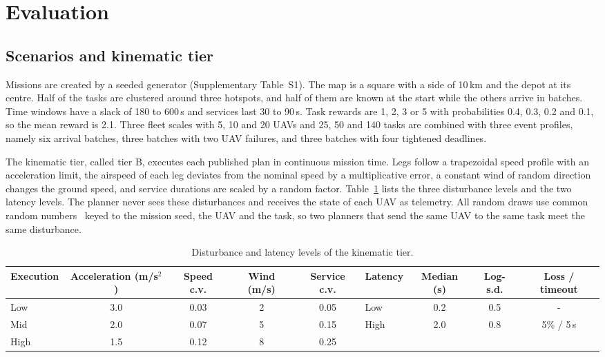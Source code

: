 \documentclass[a4paper,fleqn]{cas-dc}
\begin{document}
\section{Evaluation}\label{sec:setup}
\subsection{Scenarios and kinematic tier}
Missions are created by a seeded generator (Supplementary Table~S1). The map is a square with a side
of 10\,km and the depot at its centre. Half of the tasks are clustered around three hotspots, and half of them are
known at the start while the others arrive in batches. Time windows have a slack of 180 to 600\,s and services last 30
to 90\,s. Task rewards are 1, 2, 3 or 5 with probabilities 0.4, 0.3, 0.2 and 0.1, so the mean reward is 2.1. Three
fleet scales with 5, 10 and 20 UAVs and 25, 50 and 140 tasks are combined with three event profiles, namely six arrival
batches, three batches with two UAV failures, and three batches with four tightened deadlines.

The kinematic tier, called tier B, executes each published plan in continuous mission time. Legs follow a trapezoidal
speed profile with an acceleration limit, the airspeed of each leg deviates from the nominal speed by a multiplicative
error, a constant wind of random direction changes the ground speed, and service durations are scaled by a random
factor. Table~\ref{tab:levels} lists the three disturbance levels and the two latency levels. The planner never sees
these disturbances and receives the state of each UAV as telemetry. All random draws use common random
numbers~\cite{law2015simulation} keyed to the mission seed, the UAV and the task, so two planners that send the same
UAV to the same task meet the same disturbance.

\begin{table}[t]
\caption{Disturbance and latency levels of the kinematic tier.}\label{tab:levels}
\centering\small
\setlength{\tabcolsep}{4pt}
\begin{tabular}{lcccc@{\quad}lccc}
\toprule
Execution & Acceleration (m/s$^2$) & Speed c.v. & Wind (m/s) & Service c.v. & Latency & Median (s) & Log-s.d. & Loss / timeout \\
\midrule
Low & 3.0 & 0.03 & 2 & 0.05 & Low & 0.2 & 0.5 & - \\
Mid & 2.0 & 0.07 & 5 & 0.15 & High & 2.0 & 0.8 & 5\% / 5\,s \\
High & 1.5 & 0.12 & 8 & 0.25 & & & & \\
\bottomrule
\end{tabular}
\end{table}
\end{document}
